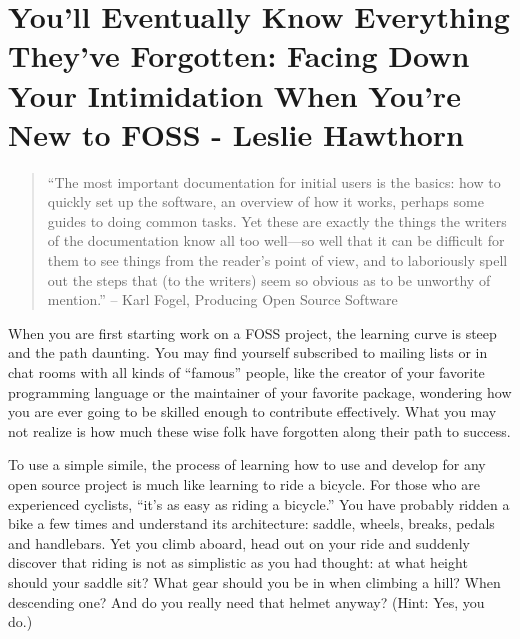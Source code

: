 \chapter{You’ll Eventually Know Everything They’ve Forgotten: Facing Down Your Intimidation When You’re New to FOSS - Leslie Hawthorn}
\begin{quote}
``The most important documentation for initial users is the basics: how to quickly set up the software, an overview of how it works, perhaps some guides to doing common tasks. Yet these are exactly the things the writers of the documentation know all too well—so well that it can be difficult for them to see things from the reader's point of view, and to laboriously spell out the steps that (to the writers) seem so obvious as to be unworthy of mention.'' -- Karl Fogel, Producing Open Source Software                                                                                                                                                                                                                                                                                                                                                                                                                                                                                                                       \end{quote}

When you are first starting work on a FOSS project, the learning curve is steep and the path daunting. You may find yourself subscribed to mailing lists or in chat rooms with all kinds of ``famous'' people, like the creator of your favorite programming language or the maintainer of your favorite package, wondering how you are ever going to be skilled enough to contribute effectively. What you may not realize is how much these wise folk have forgotten along their path to success.

To use a simple simile, the process of learning how to use and develop for any open source project is much like learning to ride a bicycle. For those who are experienced cyclists, ``it’s as easy as riding a bicycle.'' You have probably ridden a bike a few times and understand its architecture: saddle, wheels, breaks, pedals and handlebars. Yet you climb aboard, head out on your ride and suddenly discover that riding is not as simplistic as you had thought: at what height should your saddle sit? What gear should you be in when climbing a hill? When descending one? And do you really need that helmet anyway? (Hint: Yes, you do.) 

